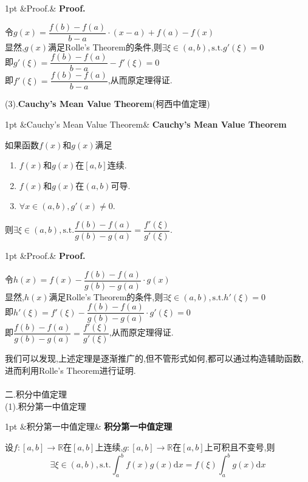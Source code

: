 \documentclass{ctexart}
\newcommand{\di}{\mathrm{d}}
\newcommand{\R}{\mathbb{R}}
\newcommand{\st}{,\text{s.t.}}
\newcommand{\dx}{\di x}
\newenvironment{formal}[1][]{%
\def\FrameCommand{%
\hspace{1pt}%
{\color{DarkBlue}\vrule width 2pt}%
{\color{formalshade}\vrule width 4pt}%
\colorbox{formalshade}%
}%
\MakeFramed{\advance\hsize-\width\FrameRestore}%
\noindent\hspace{-4.55pt}%
\begin{adjustwidth}{}{1pt}%
\setlength{\parindent}{0pt}%
\vspace{3pt}%
\ifx&#1&\else %
    \textbf{#1}\par\vspace{1pt}%
\fi
}
{%
\vspace{2pt}%
\end{adjustwidth}\endMakeFramed%
}
\newenvironment{solution}[1][]{%
\def\FrameCommand{%
\hspace{1pt}%
{\color{solutionline}\vrule width 2pt}%
{\color{solutionshade}\vrule width 4pt}%
\colorbox{solutionshade}%
}%
\MakeFramed{\advance\hsize-\width\FrameRestore}%
\noindent\hspace{-4.55pt}%
\begin{adjustwidth}{}{1pt}%
\setlength{\parindent}{0pt}%
\vspace{3pt}%
\ifx&#1&\else %
    \textbf{#1}\par\vspace{1pt}%
\fi
}
{%
\vspace{2pt}%
\end{adjustwidth}\endMakeFramed%
}
\begin{document}
\begin{solution}[Proof.]
    令$g(x)=\dfrac{f(b)-f(a)}{b-a}\cdot(x-a)+f(a)-f(x)$\\
    显然,$g(x)$满足Rolle's Theorem的条件,则$\exists\xi\in(a,b)\st g'(\xi)=0$\\
    即$g'(\xi)=\dfrac{f(b)-f(a)}{b-a}-f'(\xi)=0$\\
    即$f'(\xi)=\dfrac{f(b)-f(a)}{b-a}$,从而原定理得证.
\end{solution}\noindent
(3).\textbf{Cauchy's Mean Value Theorem}(柯西中值定理)
\begin{formal}[Cauchy's Mean Value Theorem]
    如果函数$f(x)$和$g(x)$满足
    \begin{enumerate}[leftmargin=*,label=(\alph*)]
        \item $f(x)$和$g(x)$在$[a,b]$连续.
        \item $f(x)$和$g(x)$在$(a,b)$可导.
        \item $\forall x\in(a,b),g'(x)\neq 0$.
    \end{enumerate}
    则$\exists\xi\in(a,b)\st\dfrac{f(b)-f(a)}{g(b)-g(a)}=\dfrac{f'(\xi)}{g'(\xi)}.$
\end{formal}
\begin{solution}[Proof.]
    令$h(x)=f(x)-\dfrac{f(b)-f(a)}{g(b)-g(a)}\cdot g(x)$\\
    显然,$h(x)$满足Rolle's Theorem的条件,则$\exists\xi\in(a,b)\st h'(\xi)=0$\\
    即$h'(\xi)=f'(\xi)-\dfrac{f(b)-f(a)}{g(b)-g(a)}\cdot g'(\xi)=0$\\
    即$\dfrac{f(b)-f(a)}{g(b)-g(a)}=\dfrac{f'(\xi)}{g'(\xi)}$,从而原定理得证.
\end{solution}\noindent
我们可以发现,上述定理是逐渐推广的,但不管形式如何,都可以通过构造辅助函数,进而利用Rolle's Theorem进行证明.\\
\\
二.积分中值定理 \\
(1).积分第一中值定理
\begin{formal}[积分第一中值定理]
    设$f:[a,b]\to\R$在$[a,b]$上连续,$g:[a,b]\to\R$在$[a,b]$上可积且不变号,则
    $$\exists\xi\in(a,b)\st\int_{a}^{b}{f(x)g(x)\dx}=f(\xi)\int_{a}^{b}{g(x)\dx}$$
\end{formal}
\end{document}
